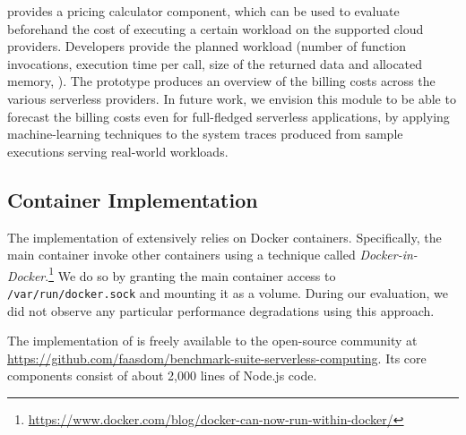 \sys provides a pricing calculator component, which can be used to evaluate beforehand the cost of executing a certain workload on the supported cloud providers. 
Developers provide the planned workload (\eg number of function invocations, execution time per call, size of the returned data and allocated memory, \etc).
The \sys prototype produces an overview of the billing costs across the various serverless providers.
In future work, we envision this module to be able to forecast the billing costs even for full-fledged serverless applications, by applying machine-learning techniques to the system traces produced from sample executions serving real-world workloads.

\subsection{Container Implementation}
\label{ssec:impl}

The implementation of \sys extensively relies on Docker containers.
Specifically, the main container invoke other containers using a technique called \emph{Docker-in-Docker}.\footnote{\url{https://www.docker.com/blog/docker-can-now-run-within-docker/}}
We do so by granting the main container access to \texttt{/var/run/docker.sock} and mounting it as a volume.
During our evaluation, we did not observe any particular performance degradations using this approach.

The implementation of \sys is freely available to the open-source community at \url{https://github.com/faasdom/benchmark-suite-serverless-computing}.
Its core components consist of about 2,000 lines of Node.js code.
